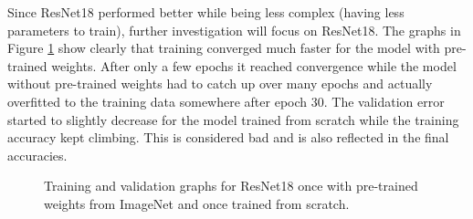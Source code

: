 \begin{table}[h] \centering
{}
\caption{Hyper parameters for ResNet18 and ResNet34 optimized with SigOpt. First row shows hyperparameters training the architecture from scratch. Second row used pre-trained weights from ImageNet}
\label{tbl:ResNet18}
\end{table}

Since ResNet18 performed better while being less complex (having less parameters to train), further investigation will focus on ResNet18.
The graphs in Figure \ref{fig:resnet18-graph} show clearly that training converged much faster for the model with pre-trained weights. After only a few epochs it reached convergence while the model without pre-trained weights had to catch up over many epochs and actually overfitted to the training data somewhere after epoch 30. The validation error started to slightly decrease for the model trained from scratch while the training accuracy kept climbing. This is considered bad and is also reflected in the final accuracies.

\begin{figure}[h]
\centering
{}
\caption{Training and validation graphs for ResNet18 once with pre-trained weights from ImageNet and once trained from scratch.}
\label{fig:resnet18-graph}
\end{figure}

